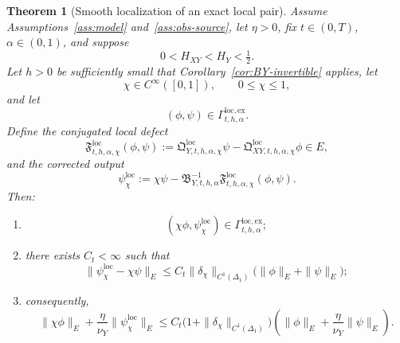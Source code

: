 \documentclass[11pt,a4paper]{amsart}
\theoremstyle{plain}
\newtheorem{theorem}{Theorem}[section]
\theoremstyle{definition}
\theoremstyle{remark}
\begin{document}
\begin{theorem}[Smooth localization of an exact local pair]
\label{thm:local-smooth-localization}
Assume Assumptions~\ref{ass:model} and~\ref{ass:obs-source}, let \(\eta>0\), fix
\(t\in(0,T)\), \(\alpha\in(0,1)\), and suppose
\[
0<H_{XY}<H_Y<\tfrac12.
\]
Let \(h>0\) be sufficiently small that Corollary~\ref{cor:BY-invertible} applies, let
\[
\chi\in C^\infty([0,1]),
\qquad
0\le \chi\le 1,
\]
and let
\[
(\phi,\psi)\in \Gamma_{t,h,\alpha}^{\mathrm{loc,ex}}.
\]
Define the conjugated local defect
\begin{equation}\label{eq:local-smooth-defect}
\mathfrak F_{t,h,\alpha,\chi}^{\mathrm{loc}}(\phi,\psi)
:=
\mathfrak Q_{Y,t,h,\alpha,\chi}^{\mathrm{loc}}\psi
-\mathfrak Q_{XY,t,h,\alpha,\chi}^{\mathrm{loc}}\phi
\in E,
\end{equation}
and the corrected output
\begin{equation}\label{eq:local-smooth-corrected}
\psi_{\chi}^{\mathrm{loc}}
:=
\chi\psi
-\mathfrak B_{Y,t,h,\alpha}^{-1}
\mathfrak F_{t,h,\alpha,\chi}^{\mathrm{loc}}(\phi,\psi).
\end{equation}
Then:
\begin{enumerate}[label=(\roman*)]
\item
\[
(\chi\phi,\psi_{\chi}^{\mathrm{loc}})
\in
\Gamma_{t,h,\alpha}^{\mathrm{loc,ex}};
\]
\item there exists \(C_t<\infty\) such that
\begin{equation}\label{eq:local-smooth-correction}
\|\psi_{\chi}^{\mathrm{loc}}-\chi\psi\|_E
\le
C_t\|\delta_\chi\|_{C^1(\Delta_1)}
\bigl(\|\phi\|_E+\|\psi\|_E\bigr);
\end{equation}
\item consequently,
\begin{equation}\label{eq:local-smooth-graph}
\|\chi\phi\|_E+\frac{\eta}{\nu_Y}\|\psi_{\chi}^{\mathrm{loc}}\|_E
\le
C_t\bigl(1+\|\delta_\chi\|_{C^1(\Delta_1)}\bigr)
\left(
\|\phi\|_E+\frac{\eta}{\nu_Y}\|\psi\|_E
\right).
\end{equation}
\end{enumerate}
\end{theorem}
\end{document}
